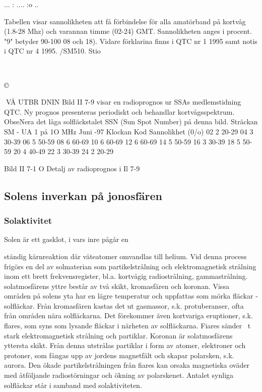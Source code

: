 ... : .... :o ..

Tabellen visar sannolikheten att få förbindelse för alla amatörband på kortvåg (1.8-28 Mhz) och varannan timme (02-24) GMT. Sannolikheten
anges i procent. "9" betyder 90-100 %
08 och 18). Vidare förklarina finns i QTC nr 1 1995 samt notis i QTC nr 4 1995. /SM510. Stio

~

©

VÅ UTBR DNIN
Bild II 7-9 visar en radioprognos ur SSAs
medlemstidning QTC. Ny prognos presenteras periodiskt och behandlar kortvågsspektrum. ObseNera det låga solfläckstalet SSN
(Sun Spot Number) på denna bild.
Sträckan SM - UA 1 på 1O MHz Juni -97
Klockan
Kod
Sannolikhet (0/o)
02
2
20-29
04
3
30-39
06
5
50-59
08
6
60-69
10
6
60-69
12
6
60-69
14
5
50-59
16
3
30-39
18
5
50-59
20
4
40-49
22
3
30-39
24
2
20-29

Bild II 7-1 O Detalj av radioprognos i Il 7-9

\subsection{Solens inverkan på jonosfären}

\subsubsection{Solaktivitet}

Solen är ett gasklot, i vars inre pågår en

ständig kärnreaktion där väteatomer omvandlas till helium. Vid denna process frigörs en del av solmaterian som partikelstrålning och elektromagnetisk strålning inom ett
brett frekvensregister, bl.a. kortvågig radiostrålning, gammastrålning. solatmosfärens
yttre består av två skikt, kromasfären och
koronan. Vissa områden på solens yta har
en lägre temperatur och uppfattas som mörka fläckar - solfläckar. Från kromasfären
kastas det ut gasmassor, s.k. protuberanser, ofta från områden nära solfläckarna.
Det förekommer även kortvariga eruptioner, s.k. flares, som syns som lysande fläckar i närheten av solfläckarna. Fiares sänder
~t stark elektromagnetisk strålning och partiklar. Koronan är solatmosfärens yttersta
skikt. Från denna utstrålas partiklar i form av
atomer, elektroner och protoner, som fångas upp av jordens magnetfält och skapar
polarsken, s.k. aurora. Den ökade partikelstrålningen från fiares kan orsaka magnetiska oväder med åtföljande radiostörningar
och ökning av polarskenet. Antalet synliga
solfläckar står i samband med solaktiviteten.

